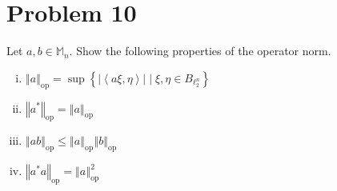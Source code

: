 \documentclass[10pt]{extarticle}
\newcommand{\iprod}[2]{\left\langle #1,#2\right\rangle}
\newcommand{\norm}[1]{\left\Vert #1\right\Vert}
\begin{document}
  \section{Problem 10}%
  Let $a,b\in \mathbb{M}_{n}$. Show the following properties of the operator norm.
  \begin{enumerate}[(i)]
    \item $\norm{a}_{\text{op}} = \sup\left\{|\iprod{a\xi}{\eta}|\mid \xi,\eta\in B_{\ell_{2}^{n}} \right\}$
    \item $\norm{a^{\ast}}_{\text{op}} = \norm{a}_{\text{op}}$
    \item $\norm{ab}_{\text{op}} \leq \norm{a}_{\text{op}}\norm{b}_{\text{op}}$
    \item $\norm{a^{\ast}a}_{\text{op}} = \norm{a}^{2}_{\text{op}}$
  \end{enumerate}
\end{document}
